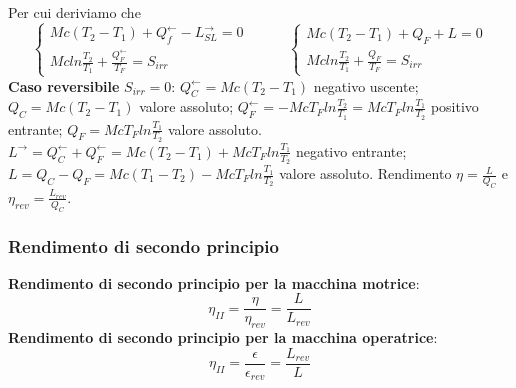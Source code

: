 Per cui deriviamo che
\[
    \begin{cases}
        Mc(T_2-T_1) + Q_f^\leftarrow - L_{SL}^\rightarrow  = 0\\
        Mc ln \frac{T_2}{T_1} + \frac{Q_F^\leftarrow}{T_F} = S_{irr}
    \end{cases} \;\;\;\;\;\;\;\;\;\; \begin{cases}
        Mc(T_2-T_1) + Q_F + L = 0\\ Mc ln \frac{T_2}{T_1} + \frac{Q_F}{T_F} = S_{irr}
    \end{cases}
\]
\textbf{Caso reversibile} $S_{irr} = 0$:
$Q_C^\leftarrow =  Mc(T_2-T_1)$ negativo uscente; \newline
$Q_C =  Mc(T_2-T_1)$ valore assoluto; \newline
\newline
$Q_F^\leftarrow  = - Mc T_F ln \frac{T_2}{T_1} = Mc T_F ln \frac{T_1}{T_2}$ positivo entrante;\newline
$Q_F = Mc T_F ln \frac{T_1}{T_2}$ valore assoluto.\newline
\newline
$L^\rightarrow  = Q_C^\leftarrow  + Q_F^\leftarrow  = Mc(T_2 -T_1) + Mc T_F ln \frac{T_1}{T_2}$ negativo entrante;\newline
$L = Q_C- Q_F = Mc (T_1-T_2) - McT_F ln \frac{T_1}{T_2}$ valore assoluto.\newline
\newline
Rendimento $\eta = \frac{L}{Q_C}$ e $\eta_{rev} = \frac{L_{rev}}{Q_C}$.
\subsubsection{Rendimento di secondo principio}
\textbf{Rendimento di secondo principio per la macchina motrice}:
\[
    \eta_{II} = \frac{\eta}{\eta_{rev}} = \frac{L}{L_{rev}}
\]
\textbf{Rendimento di secondo principio per la macchina operatrice}:
\[
    \eta_{II} = \frac{\epsilon}{\epsilon_{rev}} = \frac{L_{rev}}{L}
\]